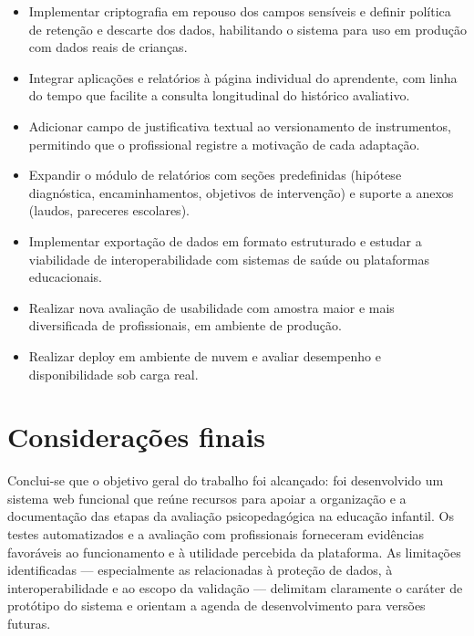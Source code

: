 \begin{itemize}
    \item Implementar criptografia em repouso dos campos sensíveis e definir política de retenção e descarte dos dados, habilitando o sistema para uso em produção com dados reais de crianças.
    \item Integrar aplicações e relatórios à página individual do aprendente, com linha do tempo que facilite a consulta longitudinal do histórico avaliativo.
    \item Adicionar campo de justificativa textual ao versionamento de instrumentos, permitindo que o profissional registre a motivação de cada adaptação.
    \item Expandir o módulo de relatórios com seções predefinidas (hipótese diagnóstica, encaminhamentos, objetivos de intervenção) e suporte a anexos (laudos, pareceres escolares).
    \item Implementar exportação de dados em formato estruturado e estudar a viabilidade de interoperabilidade com sistemas de saúde ou plataformas educacionais.
    \item Realizar nova avaliação de usabilidade com amostra maior e mais diversificada de profissionais, em ambiente de produção.
    \item Realizar deploy em ambiente de nuvem e avaliar desempenho e disponibilidade sob carga real.
\end{itemize}

\section{Considerações finais}

Conclui-se que o objetivo geral do trabalho foi alcançado: foi desenvolvido um sistema web funcional que reúne recursos para apoiar a organização e a documentação das etapas da avaliação psicopedagógica na educação infantil. Os testes automatizados e a avaliação com profissionais forneceram evidências favoráveis ao funcionamento e à utilidade percebida da plataforma. As limitações identificadas — especialmente as relacionadas à proteção de dados, à interoperabilidade e ao escopo da validação — delimitam claramente o caráter de protótipo do sistema e orientam a agenda de desenvolvimento para versões futuras.